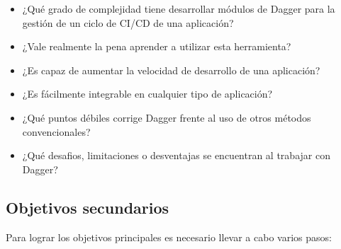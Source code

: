 \begin{itemize}
  \item ¿Qué grado de complejidad tiene desarrollar módulos de Dagger para la gestión de un ciclo de CI/CD de una aplicación?
  \item ¿Vale realmente la pena aprender a utilizar esta herramienta?
  \item ¿Es capaz de aumentar la velocidad de desarrollo de una aplicación?
  \item ¿Es fácilmente integrable en cualquier tipo de aplicación?
  \item ¿Qué puntos débiles corrige Dagger frente al uso de otros métodos convencionales?
  \item ¿Qué desafios, limitaciones o desventajas se encuentran al trabajar con Dagger?
\end{itemize}

\subsection*{Objetivos secundarios}

Para lograr los objetivos principales es necesario llevar a cabo varios pasos:

